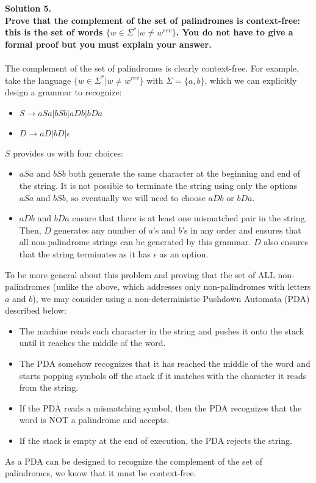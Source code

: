 \documentclass{article}
\begin{document}
\noindent \textbf{Solution 5. 
\\Prove that the complement of the set of palindromes is context-free: this is the set of words \(\{w \in \Sigma ^*|w \neq w^{rev}\}\). You do not have to give a formal proof but you must explain your answer.
}
\\
\\The complement of the set of palindromes is clearly context-free. For example, take the language \(\{w \in \Sigma ^*|w \neq w^{rev}\}\) with \(\Sigma = \{a, b\}\), which we can explicitly design a grammar to recognize:
\begin{itemize}
    \item \(S \to aSa | bSb | aDb | bDa\)
    \item \(D \to aD | bD | \epsilon\)
\end{itemize}
\(S\) provides us with four choices:
\begin{itemize}
    \item \(aSa\) and \(bSb\) both generate the same character at the beginning and end of the string. It is not possible to terminate the string using only the options \(aSa\) and \(bSb\), so eventually we will need to choose \(aDb\) or \(bDa\).
    \item \(aDb\) and \(bDa\) ensure that there is at least one mismatched pair in the string. Then, \(D\) generates any number of \(a\)'s and \(b\)'s in any order and ensures that all non-palindrome strings can be generated by this grammar. \(D\) also ensures that the string terminates as it has \(\epsilon\) as an option.
\end{itemize}
To be more general about this problem and proving that the set of ALL non-palindromes (unlike the above, which addresses only non-palindromes with letters \(a\) and \(b\)), we may consider using a non-deterministic Pushdown Automata (PDA) described below:
\begin{itemize}
    \item The machine reads each character in the string and pushes it onto the stack until it reaches the middle of the word.
    \item The PDA somehow recognizes that it has reached the middle of the word and starts popping symbols off the stack if it matches with the character it reads from the string.
    \item If the PDA reads a mismatching symbol, then the PDA recognizes that the word is NOT a palindrome and accepts.
    \item If the stack is empty at the end of execution, the PDA rejects the string.
\end{itemize}
As a PDA can be designed to recognize the complement of the set of palindromes, we know that it must be context-free.
\end{document}
